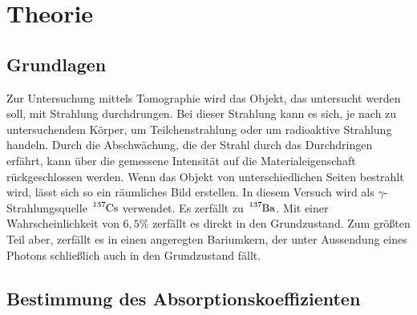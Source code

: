 \section{Theorie}
\subsection{Grundlagen}
Zur Untersuchung mittels Tomographie wird das Objekt, das untersucht werden soll, mit Strahlung durchdrungen.
Bei dieser Strahlung kann es sich, je nach zu untersuchendem Körper, um Teilchenstrahlung oder um radioaktive Strahlung handeln.
Durch die Abschwächung, die der Strahl durch das Durchdringen erfährt, kann über die gemessene Intensität auf die Materialeigenschaft rückgeschlossen werden.
Wenn das Objekt von unterschiedlichen Seiten bestrahlt wird, lässt sich so ein räumliches Bild erstellen.
In diesem Versuch wird als $\gamma$-Strahlungsquelle $\ce{^{137}Cs}$ verwendet. Es zerfällt zu $\ce{^{137}Ba}$.
Mit einer Wahrscheinlichkeit von $6,5 \percent$ zerfällt es direkt in den Grundzustand.
Zum größten Teil aber, zerfällt es in einen angeregten Bariumkern, der unter Aussendung eines Photons schließlich auch in den Grundzustand fällt.
\subsection{Bestimmung des Absorptionskoeffizienten}
